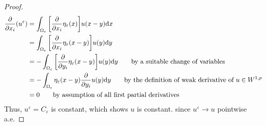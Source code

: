 \documentclass{article} %
\theoremstyle{plain}
\newcommand{\E}{\varepsilon}
\numberwithin{equation}{section} %
\numberwithin{figure}{section} %
\numberwithin{table}{section} %
\begin{document}
\begin{proof}
\begin{align*}
        \frac{\partial}{\partial x_i} (u^\E) &= \int_{\Omega_\E}\qty[\frac{\partial}{\partial x_i}\eta_\E(x)]u(x-y)\dd x \\
        &= \int_{\Omega_\E} \qty[\frac{\partial}{\partial x_i} \eta_\E(x-y)]u(y)\dd y \\
        &= -\int_{\Omega_\E} \qty[\frac{\partial}{\partial y_i}\eta_\E(x-y)]u(y)\dd y \qquad \text{by a suitable change of variables} \\
        &= -\int_{\Omega_\E} \eta_\E(x-y)\frac{\partial}{\partial y_i}u(y)\dd y \qquad \text{by the definition of weak derivative of $u \in W^{1,p}$} \\
        &= 0 \qquad \text{by assumption of all first partial derivatives}
    \end{align*}
    Thus, $u^\E = C_\E$ is constant, which shows $u$ is constant. since $u^\E \rightarrow u$ pointwise a.e.
\end{proof}
\end{document}

